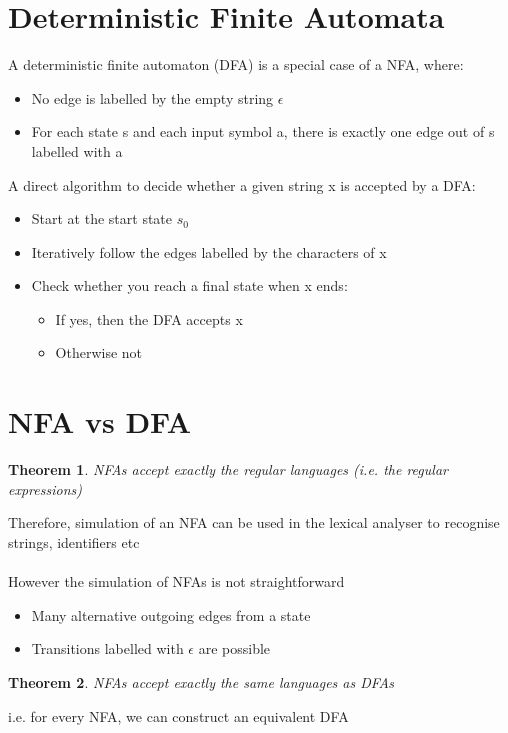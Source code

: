 \documentclass{article}[18pt]
\newtheorem{theorem}{Theorem}
\begin{document}
\section{Deterministic Finite Automata}
A deterministic finite automaton (DFA) is a special case of a NFA, where:
\begin{itemize}
	\item No edge is labelled by the empty string $\epsilon$
	\item For each state s and each input symbol a, there is exactly one edge out of s labelled with a
\end{itemize}
A direct algorithm to decide whether a given string x is accepted by a DFA:
\begin{itemize}
	\item Start at the start state $s_0$
	\item Iteratively follow the edges labelled by the characters of x
	\item Check whether you reach a final state when x ends:
	\begin{itemize}
		\item If yes, then the DFA accepts x
		\item Otherwise not
	\end{itemize}
\end{itemize}
\section{NFA vs DFA}
\begin{theorem}
NFAs accept exactly the regular languages (i.e. the regular expressions)
\end{theorem}

Therefore, simulation of an NFA can be used in the lexical analyser to recognise strings, identifiers etc\\
\\
However the simulation of NFAs is not straightforward
\begin{itemize}
	\item Many alternative outgoing edges from a state
	\item Transitions labelled with $\epsilon$ are possible
\end{itemize}
\begin{theorem}
	NFAs accept exactly the same languages as DFAs
\end{theorem}
i.e. for every NFA, we can construct an equivalent DFA
\end{document}
